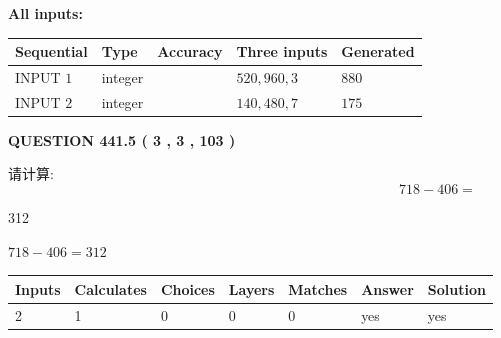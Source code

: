 \documentclass{ctexart}
\begin{document}
   
   
   
\noindent\vspace{0.1in}\hspace{-0.08in} {\textbf{\Large{All inputs: }}}
   
   
  
  
\noindent\begin{tabular}{|l|l|l|l|l|}
\hline
 Sequential & Type & Accuracy & Three inputs & Generated \\ 
\hline
 
 
  INPUT $  1 $ & integer &  & $
 520
 , 
 960
 , 
 3
 $ & $ 880 $ 
 \\  \hline  
 
 
  INPUT $  2 $ & integer &  & $
 140
 , 
 480
 , 
 7
 $ & $ 175 $ 
 \\  \hline  
 \end{tabular}
   
   
  
\vspace{0.2in}
  
{\textbf{\Large{QUESTION
441.5 
 ( 3 , 3 , 103 )
}}}
  
  
 
请计算:
\begin{equation}
718 -   %
406 = \nonumber
\end{equation}
 
 
 
\noindent{}
 
 

312
 
 
\noindent{}
 
 

 
 
 
\noindent{}
 
 

$ %
718 -  %
406=   %
312$
 
 
\noindent{}
 
 

 
   
   
   
   
\noindent\begin{tabular}{|l|l|l|l|l|l|l|}
 \hline
Inputs & Calculates & Choices & Layers & Matches & Answer & Solution \\ \hline
 2  & 
 1  & 
 0
  & 
 0  & 
 0  & 
  yes & 
  yes 
  \\ \hline
 \end{tabular}
   
\end{document}
